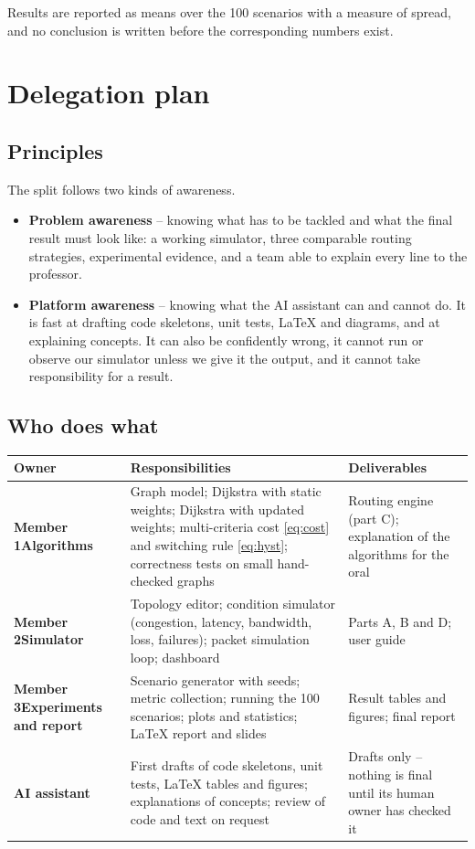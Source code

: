 \documentclass[11pt,a4paper]{article}
\begin{document}
Results are reported as means over the 100 scenarios with a measure of spread, and no conclusion is
written before the corresponding numbers exist.

\section{Delegation plan}
\subsection{Principles}
The split follows two kinds of awareness.

\begin{itemize}[leftmargin=*]
\item \textbf{Problem awareness} -- knowing what has to be tackled and what the final result must
look like: a working simulator, three comparable routing strategies, experimental evidence, and a
team able to explain every line to the professor.
\item \textbf{Platform awareness} -- knowing what the AI assistant can and cannot do. It is fast at
drafting code skeletons, unit tests, \LaTeX{} and diagrams, and at explaining concepts. It can also
be confidently wrong, it cannot run or observe our simulator unless we give it the output, and it
cannot take responsibility for a result.
\end{itemize}

\subsection{Who does what}
\begin{center}
\begin{tabularx}{\textwidth}{>{\bfseries}p{2.5cm}LL}
\toprule
Owner & Responsibilities & Deliverables \\
\midrule
Member 1\newline Algorithms &
Graph model; Dijkstra with static weights; Dijkstra with updated weights; multi-criteria cost
\eqref{eq:cost} and switching rule \eqref{eq:hyst}; correctness tests on small hand-checked graphs &
Routing engine (part C); explanation of the algorithms for the oral \\
\addlinespace
Member 2\newline Simulator &
Topology editor; condition simulator (congestion, latency, bandwidth, loss, failures); packet
simulation loop; dashboard &
Parts A, B and D; user guide \\
\addlinespace
Member 3\newline Experiments and report &
Scenario generator with seeds; metric collection; running the 100 scenarios; plots and statistics;
\LaTeX{} report and slides &
Result tables and figures; final report \\
\addlinespace
AI assistant &
First drafts of code skeletons, unit tests, \LaTeX{} tables and figures; explanations of concepts;
review of code and text on request &
Drafts only -- nothing is final until its human owner has checked it \\
\bottomrule
\end{tabularx}
\end{center}
\end{document}
